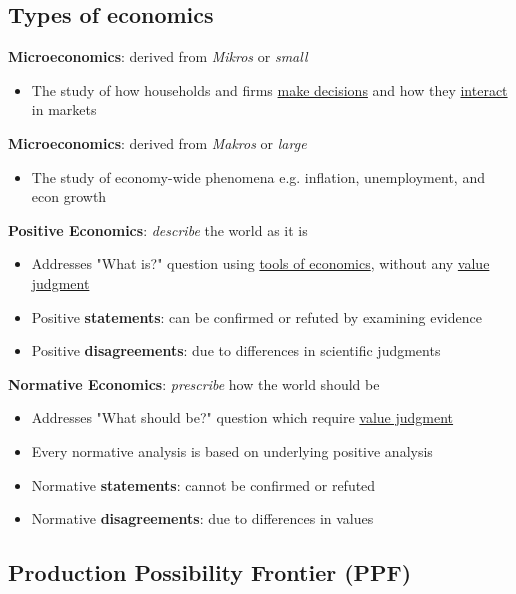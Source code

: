\documentclass{article}
\begin{document}
\begin{multicols}{2}
\subsection{Types of economics}
\textbf{Microeconomics}: derived from \textit{Mikros} or \textit{small}
\begin{itemize}
	\item The study of how households and firms \underline{make decisions} and how they \underline{interact} in markets
\end{itemize}
\textbf{Microeconomics}: derived from \textit{Makros} or \textit{large}
\begin{itemize}
	\item The study of economy-wide phenomena e.g. inflation, unemployment, and econ growth
\end{itemize}
\textbf{Positive Economics}: \textit{describe} the world as it is
\begin{itemize}
	\item Addresses "What is?" question using \underline{tools of economics}, without any \underline{value judgment}
	\item Positive \textbf{statements}: can be confirmed or refuted by examining evidence
	\item Positive \textbf{disagreements}: due to differences in scientific judgments
\end{itemize}
\textbf{Normative Economics}: \textit{prescribe} how the world should be
\begin{itemize}
	\item Addresses "What should be?" question which require \underline{value judgment}
	\item Every normative analysis is based on underlying positive analysis
	\item Normative \textbf{statements}: cannot be confirmed or refuted
	\item Normative \textbf{disagreements}: due to differences in values
\end{itemize}

\subsection{Production Possibility Frontier (PPF)}


\end{multicols}
\end{document}
